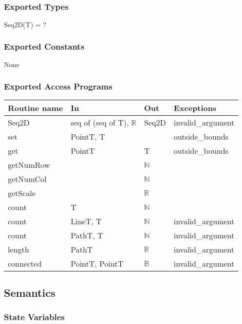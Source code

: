 \documentclass[12pt]{article}
\begin{document}
\subsubsection* {Exported Types}

Seq2D(T) = ?

\subsubsection* {Exported Constants}

None

\subsubsection* {Exported Access Programs}

\begin{tabular}{| l | l | l | p{5cm} |}
\hline
\textbf{Routine name} & \textbf{In} & \textbf{Out} & \textbf{Exceptions}\\
\hline
Seq2D & seq of (seq of T), $\mathbb{R}$ & Seq2D & invalid\_argument\\
\hline
set & PointT, T & ~ & outside\_bounds\\
\hline
get & PointT & T & outside\_bounds\\
\hline
getNumRow & ~ & $\mathbb{N}$ & \\
\hline
getNumCol & ~ & $\mathbb{N}$ & \\
\hline
getScale & ~ & $\mathbb{R}$ & \\
\hline
count & T & $\mathbb{N}$ & \\
\hline
count & LineT, T & $\mathbb{N}$ & invalid\_argument\\
\hline
count & PathT, T & $\mathbb{N}$ & invalid\_argument\\
\hline
length & PathT & $\mathbb{R}$ & invalid\_argument\\
\hline
connected & PointT, PointT & $\mathbb{B}$ & invalid\_argument\\
\hline
\end{tabular}

\subsection* {Semantics}

\subsubsection* {State Variables}
\end{document}
